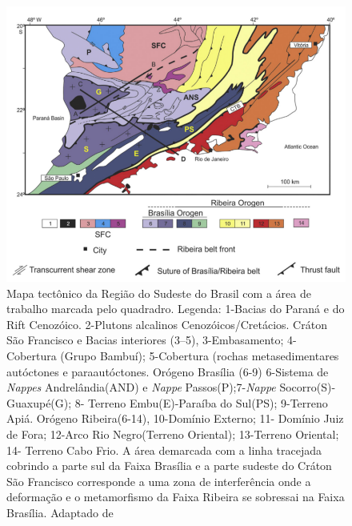 \begin{figure}[!ht]
\centering
\includegraphics[scale=0.5]{Figs/mapa_geologico.png}
\caption[Mapa tectônico da Região do Sudeste do Brasil segundo  \cite{trouw_new_2013}.]{Mapa tectônico da Região do Sudeste do Brasil com a área de trabalho marcada pelo quadradro. Legenda: 1-Bacias do Paraná e do Rift Cenozóico. 2-Plutons alcalinos Cenozóicos/Cretácios. Cráton São Francisco e Bacias interiores (3–5), 3-Embasamento; 4-Cobertura (Grupo Bambuí); 5-Cobertura (rochas metasedimentares autóctones e paraautóctones. Orógeno Brasília (6-9) 6-Sistema de \textit{Nappes} Andrelândia(AND) e \textit{Nappe} Passos(P);7-\textit{Nappe} Socorro(S)-Guaxupé(G); 8- Terreno Embu(E)-Paraíba do Sul(PS); 9-Terreno Apiá. Orógeno Ribeira(6-14), 10-Domínio Externo; 11- Domínio Juiz de Fora; 12-Arco Rio Negro(Terreno Oriental); 13-Terreno Oriental; 14- Terreno Cabo Frio. A área demarcada com a linha tracejada cobrindo a parte sul da Faixa Brasília e a parte sudeste do Cráton São Francisco corresponde a uma zona de interferência onde a deformação e o metamorfismo da Faixa Ribeira se  sobressai na Faixa Brasília. Adaptado de \cite{trouw_new_2013}}
\label{mapa_geologico}
\end{figure} 


